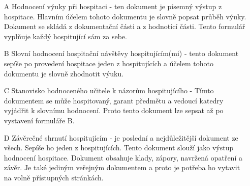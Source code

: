 \label{sec:formulare}
\begin{itemize}
\item[A] Hodnocení výuky při hospitaci - ten dokument  je písemný výstup z hospitace. Hlavním účelem tohoto dokumentu je slovně popsat průběh výuky. Dokument se skládá z dokumentační části a z hodnotící části. Tento formulář vyplňuje každý hospitující sám za sebe.
\item[B] Slovní hodnocení hospitační návštěvy hospitujícím(mi) - tento dokument sepíše po provedení hospitace jeden z hospitujících a účelem tohoto dokumentu je slovně zhodnotit výuku. 
\item[C] Stanovisko hodnoceného učitele k názorům hospitujícího - Tímto dokumentem se může hospitovaný, garant předmětu a vedoucí katedry vyjádřit k slovnímu hodnocení. Proto tento dokument lze sepsat až po vystavení formuláře B.
\item[D] Závěrečné shrnutí hospitujícím - je poslední a nejdůležitější dokument ze všech. Sepíše ho jeden z hospitujících. Tento dokument slouží jako výstup hodnocení hospitace. Dokument obsahuje klady, zápory, navržená opatření a závěr. Je také jediným veřejným dokumentem a proto je potřeba ho vytavit na volně přístupných stránkách.
\end{itemize}